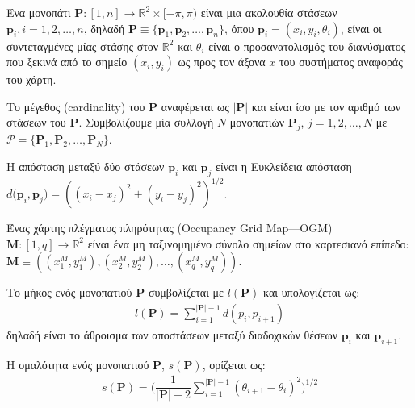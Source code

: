 \begin{bw_box}
\begin{definition}
Ένα μονοπάτι $\bm{P} : [1,n] \rightarrow \mathbb{R}^2 \times [-\pi, \pi)$ είναι
μια ακολουθία στάσεων $\bm{p}_i, i = 1,2,\dots,n$, δηλαδή
$\bm{P} \equiv \{\bm{p}_1, \bm{p}_2, \dots, \bm{p}_n\}$, όπου
$\bm{p}_i = (x_i, y_i, \theta_i)$, είναι οι συντεταγμένες μίας στάσης στον
$\mathbb{R}^2$ και $\theta_i$ είναι ο προσανατολισμός του διανύσματος που
ξεκινά από το σημείο $(x_i,y_i)$ ως προς τον άξονα $x$ του συστήματος αναφοράς
του χάρτη.
\end{definition}
\end{bw_box}

Το μέγεθος (cardinality) του $\bm{P}$ αναφέρεται ως $|\bm{P}|$ και
είναι ίσο με τον αριθμό των στάσεων του $\bm{P}$. Συμβολίζουμε μία συλλογή $N$
μονοπατιών $\bm{P}_j$, $j = 1,2,\dots,N$ με $\bm{\mathcal{P}} = \{\bm{P}_1,
\bm{P}_2, \dots, \bm{P}_N\}$.

\begin{bw_box}
\begin{definition}
Η απόσταση μεταξύ δύο στάσεων $\bm{p}_i$ και $\bm{p}_j$ είναι η
Ευκλείδεια απόσταση $d\bm{(p}_i,\bm{p}_j) = ((x_i - x_j)^2 + (y_i - y_j)^2)^{1/2}$.
\end{definition}
\end{bw_box}

\begin{bw_box}
\begin{definition}
Ένας χάρτης πλέγματος πληρότητας (Occupancy Grid Map---OGM)
$\bm{M} : [1, q] \rightarrow \mathbb{R}^2$ είναι ένα
μη ταξινομημένο σύνολο σημείων στο καρτεσιανό επίπεδο:
$\bm{M} \equiv ((x_1^M, y_1^M), (x_2^M, y_2^M), \dots, (x_q^M, y_q^M) )$.
\end{definition}
\end{bw_box}

\begin{bw_box}
\begin{definition}
Το μήκος ενός μονοπατιού $\bm{P}$ συμβολίζεται με $l(\bm{P})$ και υπολογίζεται
ως:
\begin{align}
  l(\bm{P}) = \sum\limits_{i=1}^{|\bm{P}|-1} d(p_i, p_{i+1})
  \label{eq:path_length}
\end{align}
δηλαδή είναι το άθροισμα των αποστάσεων μεταξύ διαδοχικών θέσεων
  $\bm{p}_i$ και $\bm{p}_{i+1}$.
\end{definition}
\end{bw_box}

\begin{bw_box}
\begin{definition}
Η ομαλότητα ενός μονοπατιού $\bm{P}$, $s(\bm{P})$, ορίζεται ως:
\begin{align}
  s(\bm{P}) = \Big(\dfrac{1}{|\bm{P}|-2}\sum\limits_{i=1}^{|\bm{P}|-1} (\theta_{i+1} - \theta_i)^2\Big)^{1/2}
  \label{eq:path_smoothness}
\end{align}
\end{definition}
\end{bw_box}

